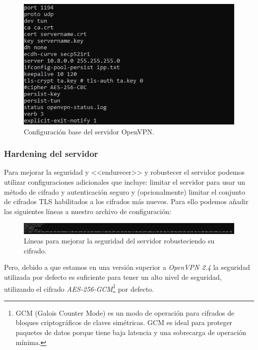\documentclass[a4paper, 11pt, titlepage]{article}
\begin{document}
            \begin{figure}[htp]
                \centering
                \includegraphics[width=1\textwidth]{resources/openvpn05.png}
                \caption{Configuración base del servidor OpenVPN.}
                \label{}
            \end{figure}    
    
    
        \subsubsection{Hardening del servidor}

            Para mejorar la seguridad y <<endurecer>> y robustecer el servidor podemos utilizar configuraciones 
            adicionales que incluye: limitar el servidor para usar un método de cifrado y autenticación seguro y 
            (opcionalmente) limitar el conjunto de cifrados TLS habilitados a los cifrados más nuevos. Para
            ello podemos añadir las siguientes líneas a nuestro archivo de configuración:
        
            \begin{figure}[htp]
                \centering
                \includegraphics[width=1\textwidth]{resources/openvpn06.png}
                \caption{Líneas para mejorar la seguridad del servidor robusteciendo su cifrado.}
                \label{}
            \end{figure} 
        
            Pero, debido a que estamos en una versión superior a \textit{OpenVPN 2.4} la seguridad utilizada
            por defecto es suficiente para tener un alto nivel de seguridad, utilizando el cifrado 
            \textit{AES-256-GCM}\footnote{
                GCM (Galois Counter Mode) es un modo de operación para cifrados de bloques criptográficos de
                claves simétricas. GCM es ideal para proteger paquetes de datos porque tiene baja latencia 
                y una sobrecarga de operación mínima.
            }
            por defecto.
        
\end{document}
